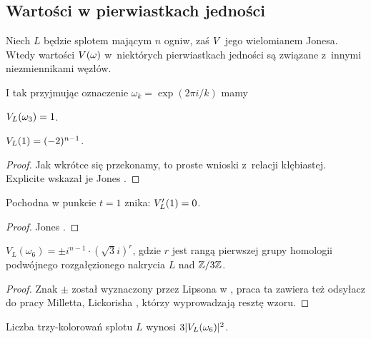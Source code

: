 
\subsection{Wartości w pierwiastkach jedności}
Niech $L$ będzie splotem mającym $n$ ogniw, zaś $V$ jego wielomianem Jonesa.
Wtedy wartości $V(\omega)$ w~niektórych pierwiastkach jedności są związane z~innymi niezmiennikami węzłów.

I tak przyjmując oznaczenie $\omega_k = \exp(2\pi i/k)$ mamy

\begin{proposition}
    \label{prp:jones_at_roots_of_unity}
    $V_L(\omega_3) = 1$.
\end{proposition}

\begin{proposition}
    $V_L(1) = (-2)^{n-1}$.
\end{proposition}

\begin{proof}
%
    Jak wkrótce się przekonamy, to proste wnioski z~relacji kłębiastej.
    Explicite wskazał je Jones \cite[twierdzenie 14, 15]{jones1985}.
\end{proof}

\begin{proposition}
    Pochodna w punkcie $t = 1$ znika: $V'_L(1) = 0$.
\end{proposition}

\begin{proof}
    Jones \cite[twierdzenie 16]{jones1985}.
\end{proof}

\begin{proposition}
    $V_L(\omega_6) = \pm i^{n-1} \cdot (\sqrt 3i)^r$, gdzie $r$ jest rangą pierwszej grupy homologii podwójnego rozgałęzionego nakrycia $L$ nad $\mathbb Z/3\mathbb Z$.
\end{proposition}

\begin{proof}
%
    Znak $\pm$ został wyznaczony przez Lipsona w \cite{lipson1986}, praca ta zawiera też odsyłacz do pracy Milletta, Lickorisha \cite{lickorish1986}, którzy wyprowadzają resztę wzoru.
\end{proof}

\begin{proposition}
    Liczba trzy-kolorowań splotu $L$ wynosi $3|V_L(\omega_6)|^2$.
\end{proposition}

